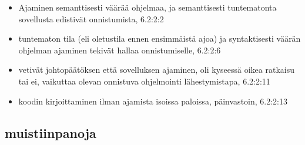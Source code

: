 \begin{itemize}
\begin{itemize}
\begin{itemize}
        \end{itemize}
        \item Ajaminen semanttisesti väärää ohjelmaa, ja semanttisesti tuntematonta sovellusta edistivät onnistumista, 6.2:2:2
        \item tuntematon tila (eli oletustila ennen ensimmäistä ajoa) ja syntaktisesti väärän ohjelman ajaminen tekivät hallaa onnistumiselle, 6.2:2:6
        \item vetivät johtopäätöksen että sovelluksen ajaminen, oli kyseessä oikea ratkaisu tai ei, vaikuttaa olevan onnistuva ohjelmointi lähestymistapa, 6.2:2:11
        \item koodin kirjoittaminen ilman ajamista isoissa paloissa, päinvastoin, 6.2:2:13
    \end{itemize}
\end{itemize} 


\subsection{muistiinpanoja}


